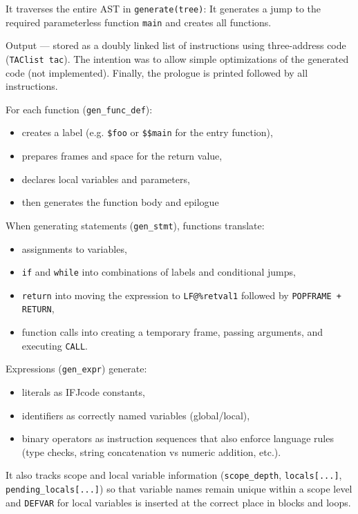 \documentclass{article}
\begin{document}
It traverses the entire AST in \texttt{generate(tree)}:  
It generates a jump to the required parameterless function \texttt{main} and creates all functions.

Output — stored as a doubly linked list of instructions using three-address code (\texttt{TAClist tac}).  
The intention was to allow simple optimizations of the generated code (not implemented).  
Finally, the prologue is printed followed by all instructions.\bigskip

\noindent For each function (\texttt{gen\_func\_def}):

\begin{itemize}
    \item creates a label (e.g. \texttt{\$foo} or \texttt{\$\$main} for the entry function),
    \item prepares frames and space for the return value,
    \item declares local variables and parameters,
    \item then generates the function body and epilogue
\end{itemize}

When generating statements (\texttt{gen\_stmt}), functions translate:

\begin{itemize}
    \item assignments to variables,
    \item \texttt{if} and \texttt{while} into combinations of labels and conditional jumps,
    \item \texttt{return} into moving the expression to \texttt{LF@\%retval1} followed by \texttt{POPFRAME + RETURN},
    \item function calls into creating a temporary frame, passing arguments, and executing \texttt{CALL}.
\end{itemize}

Expressions (\texttt{gen\_expr}) generate:

\begin{itemize}
    \item literals as IFJcode constants,
    \item identifiers as correctly named variables (global/local),
    \item binary operators as instruction sequences that also enforce language rules (type checks, string concatenation vs numeric addition, etc.).
\end{itemize}

It also tracks scope and local variable information (\texttt{scope\_depth}, \texttt{locals[...]}, \texttt{pending\_locals[...]})  
so that variable names remain unique within a scope level and \texttt{DEFVAR} for local variables is inserted at the correct place in blocks and loops.
\end{document}
